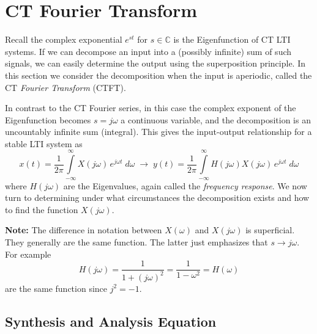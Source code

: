 \section{CT Fourier Transform}

Recall the complex exponential $e^{st}$ for $s\in\mathbb{C}$ is the Eigenfunction of CT LTI systems. If we can decompose an input into a (possibly infinite) sum of such signals, we can easily determine the output using the superposition principle. In this section we consider the decomposition when the input is aperiodic, called the CT \emph{Fourier Transform} (CTFT).

In contrast to the CT Fourier series, in this case the complex exponent of the Eigenfunction becomes $s = j\omega$ a continuous variable, and the decomposition is an uncountably infinite sum (integral). This gives the input-output relationship for a stable LTI system as
\[
x(t) = \frac{1}{2\pi}\int\limits_{-\infty}^{\infty} X(j\omega) \, e^{j \omega t}\; d\omega \;\longrightarrow\; y(t) = \frac{1}{2\pi}\int\limits_{-\infty}^{\infty} H(j\omega) X(j\omega) \, e^{j \omega t}\; d\omega
\]
where $H(j \omega)$ are the Eigenvalues, again called the \emph{frequency response}. We now turn to determining under what circumstances the decomposition exists and how to find the function $X(j\omega)$.

\textbf{Note:} The difference in notation between $X(\omega)$ and $X(j\omega)$ is superficial. They generally are the same function. The latter just emphasizes that $s \rightarrow j\omega$. For example
\[
H(j\omega) = \frac{1}{1+(j\omega)^2} = \frac{1}{1-\omega^2} = H(\omega) 
\]
are the same function since $j^2 = -1$.

\subsection{Synthesis and Analysis Equation}

